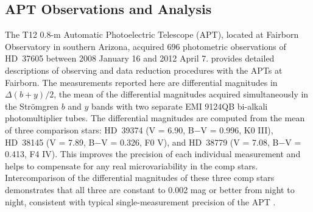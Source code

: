 \subsection{APT Observations and Analysis}\label{sec:apt}


The T12 0.8-m Automatic Photoelectric Telescope (APT), located at Fairborn 
Observatory in southern Arizona, acquired 696 photometric observations of
HD~37605 between 2008 January 16 and 2012 April 7. \cite{henry1999} provides 
detailed descriptions of observing and data reduction procedures with 
the APTs at Fairborn. The measurements reported here are differential 
magnitudes in $\Delta (b+y)/2$, the mean of the differential magnitudes 
acquired simultaneously in the Str\"omgren $b$ and $y$ bands with two
separate EMI 9124QB bi-alkali photomultiplier tubes.
The differential magnitudes are computed from the mean of three 
comparison stars:
HD~39374 (V = 6.90, B$-$V = 0.996, K0 III), 
HD~38145 (V = 7.89, B$-$V = 0.326, F0 V), 
and HD~38779 (V = 7.08, B$-$V = 0.413, F4 IV).
This improves the precision of each individual measurement and helps to 
compensate for any real microvariability in the comp stars. Intercomparison 
of the differential magnitudes of these three comp stars demonstrates that all 
three are constant to 0.002 mag or better from night to night, consistent with
typical single-measurement precision of the APT 
\citep[0.0015-0.002 mag;][]{henry1999}.




